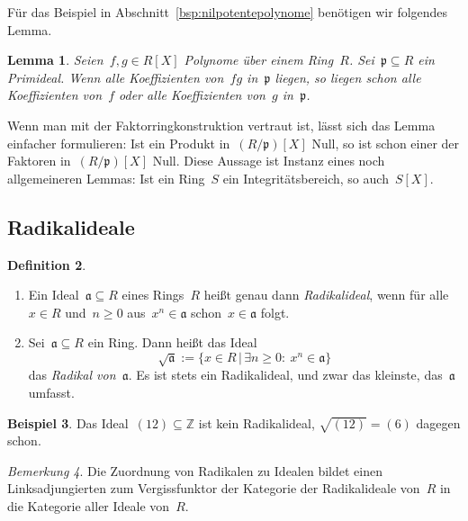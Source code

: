 \documentclass[a4paper,ngerman,12pt]{scrartcl}
\theoremstyle{definition}
\newtheorem{defn}{Definition}[section]
\newtheorem{bsp}[defn]{Beispiel}
\theoremstyle{plain}
\newtheorem{lemma}[defn]{Lemma}
\theoremstyle{remark}
\newtheorem{bem}[defn]{Bemerkung}
\newcommand{\ZZ}{\mathbb{Z}}
\renewcommand{\aa}{\mathfrak{a}}
\newcommand{\pp}{\mathfrak{p}}
\renewcommand{\_}{\mathpunct{.}\,}
\newcommand{\?}{\,{:}\,}
\begin{document}
Für das Beispiel in Abschnitt~\ref{bsp:nilpotentepolynome} benötigen wir
folgendes Lemma.
\begin{lemma}\label{produktprim}Seien~$f,g \in R[X]$ Polynome über einem Ring~$R$. Sei~$\pp
\subseteq R$ ein Primideal. Wenn alle Koeffizienten von~$fg$ in~$\pp$ liegen,
so liegen schon alle Koeffizienten von~$f$ oder alle Koeffizienten von~$g$
in~$\pp$.\end{lemma}
Wenn man mit der Faktorringkonstruktion vertraut ist, lässt sich das Lemma
einfacher formulieren: Ist ein Produkt in~$(R/\pp)[X]$ Null, so ist schon einer
der Faktoren in~$(R/\pp)[X]$ Null. Diese Aussage ist Instanz eines noch
allgemeineren Lemmas: Ist ein Ring~$S$ ein Integritätsbereich, so auch~$S[X]$.


\subsection{Radikalideale}

\begin{defn}\label{def:radikal}\begin{enumerate}
\item Ein Ideal~$\aa \subseteq R$ eines Rings~$R$ heißt genau dann
\emph{Radikalideal}, wenn für alle~$x
\in R$ und~$n \geq 0$ aus~$x^n \in \aa$ schon~$x \in \aa$ folgt.
\item Sei~$\aa \subseteq R$ ein Ring. Dann heißt das Ideal
\[ \sqrt{\aa} := \{ x \in R \,|\, \exists n \geq 0{:}\ x^n \in \aa \} \]
das \emph{Radikal von~$\aa$}. Es ist stets ein Radikalideal, und zwar das
kleinste, das~$\aa$ umfasst.
\end{enumerate}\end{defn}

\begin{bsp}Das Ideal~$(12) \subseteq \ZZ$ ist kein Radikalideal, $\sqrt{(12)} =
(6)$ dagegen schon.\end{bsp}

\begin{bem}Die Zuordnung von Radikalen zu Idealen bildet einen
Linksadjungierten zum Vergissfunktor der Kategorie der Radikalideale von~$R$ in
die Kategorie aller Ideale von~$R$.\end{bem}
\end{document}
